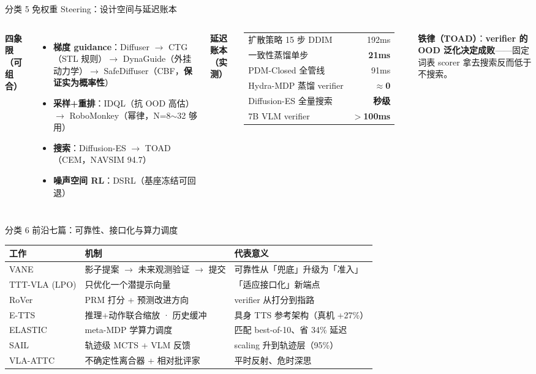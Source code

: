 \documentclass[10pt,aspectratio=169]{beamer}
\newcommand{\hl}[1]{\textcolor{good}{\textbf{#1}}}
\newcommand{\wa}[1]{\textcolor{warn}{\textbf{#1}}}
\newcommand{\ba}[1]{\textcolor{bad}{\textbf{#1}}}
\begin{document}
\begin{frame}{分类 5 免权重 Steering：设计空间与延迟账本}
\begin{columns}[T]
\textbf{四象限（可组合）}
\begin{itemize}
\item \textbf{梯度 guidance}：Diffuser $\to$ CTG（STL 规则）$\to$ DynaGuide（外挂动力学）$\to$ SafeDiffuser（CBF，\wa{保证实为概率性}）
\item \textbf{采样+重排}：IDQL（抗 OOD 高估）$\to$ RoboMonkey（幂律，N=8$\sim$32 够用）
\item \textbf{搜索}：Diffusion-ES $\to$ TOAD（CEM，NAVSIM 94.7）
\item \textbf{噪声空间 RL}：DSRL（基座冻结可回退）
\end{itemize}
\textbf{延迟账本（实测）}
\small
\begin{tabular}{lr}
\toprule
扩散策略 15 步 DDIM & 192ms\\
一致性蒸馏单步 & \hl{21ms}\\
PDM-Closed 全管线 & 91ms\\
Hydra-MDP 蒸馏 verifier & \hl{$\approx$0}\\
Diffusion-ES 全量搜索 & \ba{秒级}\\
7B VLM verifier & \ba{$>$100ms}\\
\bottomrule
\end{tabular}
\vspace{4pt}

\textbf{铁律（TOAD）}：\ba{verifier 的 OOD 泛化决定成败}——固定词表 scorer 拿去搜索反而低于不搜索。
\end{columns}
\end{frame}

\begin{frame}{分类 6 前沿七篇：可靠性、接口化与算力调度}
\small
\begin{tabular}{p{}p{}p{}}
\toprule
\textbf{工作} & \textbf{机制} & \textbf{代表意义}\\
\midrule
VANE & 影子提案 $\to$ 未来观测验证 $\to$ 提交 & 可靠性从「兜底」升级为「准入」\\
TTT-VLA (LPO) & 只优化一个潜提示向量 & 「适应接口化」新端点\\
RoVer & PRM 打分 + 预测改进方向 & verifier 从打分到指路\\
E-TTS & 推理+动作联合缩放 · 历史缓冲 & 具身 TTS 参考架构（真机 +27\%）\\
ELASTIC & meta-MDP 学算力调度 & 匹配 best-of-10、省 34\% 延迟\\
SAIL & 轨迹级 MCTS + VLM 反馈 & scaling 升到轨迹层（95\%）\\
VLA-ATTC & 不确定性离合器 + 相对批评家 & 平时反射、危时深思\\
\bottomrule
\end{tabular}
\end{frame}
\end{document}
